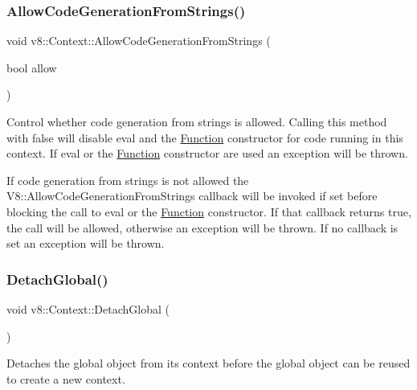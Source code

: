 \subsubsection{\texorpdfstring{Allow\+Code\+Generation\+From\+Strings()}{AllowCodeGenerationFromStrings()}}
{\footnotesize\ttfamily void v8\+::\+Context\+::\+Allow\+Code\+Generation\+From\+Strings (\begin{DoxyParamCaption}\item[{bool}]{allow }\end{DoxyParamCaption})}

Control whether code generation from strings is allowed. Calling this method with false will disable \textquotesingle{}eval\textquotesingle{} and the \textquotesingle{}\mbox{\hyperlink{classv8_1_1Function}{Function}}\textquotesingle{} constructor for code running in this context. If \textquotesingle{}eval\textquotesingle{} or the \textquotesingle{}\mbox{\hyperlink{classv8_1_1Function}{Function}}\textquotesingle{} constructor are used an exception will be thrown.

If code generation from strings is not allowed the V8\+::\+Allow\+Code\+Generation\+From\+Strings callback will be invoked if set before blocking the call to \textquotesingle{}eval\textquotesingle{} or the \textquotesingle{}\mbox{\hyperlink{classv8_1_1Function}{Function}}\textquotesingle{} constructor. If that callback returns true, the call will be allowed, otherwise an exception will be thrown. If no callback is set an exception will be thrown. \mbox{\label{classv8_1_1Context_a841c7dd92eb8c57df92a268a164dea97}} 
\subsubsection{\texorpdfstring{Detach\+Global()}{DetachGlobal()}}
{\footnotesize\ttfamily void v8\+::\+Context\+::\+Detach\+Global (\begin{DoxyParamCaption}{ }\end{DoxyParamCaption})}

Detaches the global object from its context before the global object can be reused to create a new context. \mbox{\label{classv8_1_1Context_a6995c49d9897eb49053f07874b825133}} 
